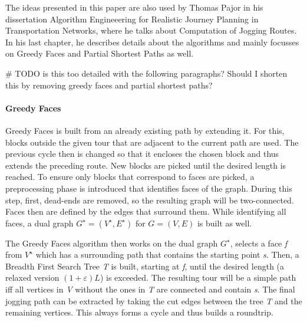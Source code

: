 The ideas presented in this paper are also used by Thomas Pajor in his dissertation \glqq Algorithm Engineeering for Realistic Journey Planning in Transportation Networks\grqq \cite{pajor_algorithm_2013}, where he talks about Computation of Jogging Routes. In his last chapter, he describes details about the algorithms and mainly focusses on Greedy Faces and Partial Shortest Paths as well.

\# TODO is this too detailed with the following paragraphs? Should I shorten this by removing greedy faces and partial shortest paths?


\paragraph{Greedy Faces}

Greedy Faces is built from an already existing path by extending it.
For this, blocks outside the given tour that are adjacent to the current path are used.
The previous cycle then is changed so that it encloses the chosen block and thus extends the preceding route. 
New blocks are picked until the desired length is reached.
To ensure only blocks that correspond to faces are picked, a preprocessing phase is introduced that identifies faces of the graph.
During this step, first, dead-ends are removed, so the resulting graph will be two-connected.
Faces then are defined by the edges that surround them. 
While identifying all faces, a dual graph $G^{\star} = (V^{\star},E^{\star})$ for $G = (V,E)$ is built as well.

The Greedy Faces algorithm then works on the dual graph $G^{\star}$, selects a face \textit{f} from $V^{\star}$ which has a surrounding path that contains the starting point \textit{s}. 
Then, a Breadth First Search Tree \textit{T} is built, starting at \textit{f}, until the desired length (a relaxed version $(1 + \varepsilon) L$) is exceeded.
The resulting tour will be a simple path iff all vertices in \textit{V} without the ones in \textit{T} are connected and contain \textit{s}.
The final jogging path can be extracted by taking the cut edges between the tree \textit{T} and the remaining vertices.
This always forms a cycle and thus builds a roundtrip.

